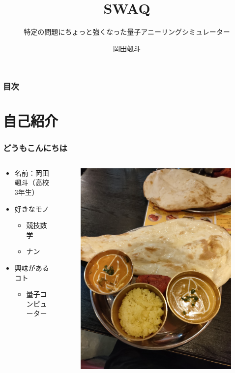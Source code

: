 \title[Swaq]{\color{black} \LARGE SWAQ}
\subtitle[ちょっと強いQAS]{特定の問題にちょっと強くなった量子アニーリングシミュレーター}
\author[岡田颯斗]{岡田颯斗}
\date{}
\begin{frame}{}
\titlepage
\end{frame}
\large

\begin{frame}
  \frametitle{目次}
  \tableofcontents
\end{frame}


\section{自己紹介}
\begin{frame}
  \frametitle{どうもこんにちは}
  \begin{columns}
    \begin{column}{0.5\linewidth}
      \begin{itemize}
        \item 名前：岡田颯斗（高校3年生）
        \item 好きなモノ
        \begin{itemize}
            \item 競技数学
            \item ナン
        \end{itemize}
        \item 興味があるコト
        \begin{itemize}
          \item 量子コンピューター
        \end{itemize}
    \end{itemize}
    \end{column}
    \begin{column}{0.5\linewidth}
      \begin{figure}
        \includegraphics[width=0.7\linewidth]{data/nan}

\end{figure}
\end{column}
\end{columns}
\end{frame}
